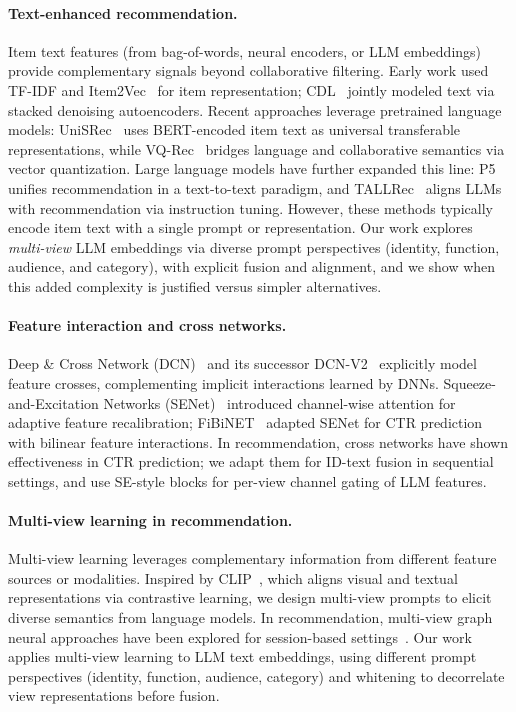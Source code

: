 \documentclass[sigconf,natbib=true,anonymous]{acmart}
\newcommand{\llm}{\textsc{LLM}\xspace}
\begin{document}
\paragraph{Text-enhanced recommendation.}
\begin{sloppypar}
Item text features (from bag-of-words, neural encoders, or
\llm embeddings) provide complementary signals beyond
collaborative filtering. Early work used TF-IDF and
Item2Vec~\cite{barkan2016item2vec} for item representation;
CDL~\cite{wang2015cdl} jointly modeled text via stacked
denoising autoencoders. Recent approaches leverage pretrained
language models: UniSRec~\cite{hou2022unisrec} uses
BERT-encoded item text as universal transferable
representations, while VQ-Rec~\cite{hou2023vqrec} bridges
language and collaborative semantics via vector quantization.
Large language models have further expanded this line:
P5~\cite{geng2022p5} unifies recommendation in a text-to-text
paradigm, and TALLRec~\cite{bao2023tallrec} aligns LLMs with
recommendation via instruction tuning.
However, these methods typically encode item text with a single
prompt or representation.
Our work explores \emph{multi-view} \llm embeddings via diverse
prompt perspectives (identity, function, audience, and category),
with explicit fusion and alignment, and we show when this added
complexity is justified versus simpler alternatives.
\end{sloppypar}

\paragraph{Feature interaction and cross networks.}
Deep \& Cross Network (DCN)~\cite{wang2017dcn} and its
successor DCN-V2~\cite{wang2021dcnv2} explicitly model feature
crosses, complementing implicit interactions learned by DNNs.
Squeeze-and-Excitation Networks (SENet)~\cite{hu2018senet}
introduced channel-wise attention for adaptive feature
recalibration; FiBiNET~\cite{huang2019fibinet} adapted SENet
for CTR prediction with bilinear feature interactions. In
recommendation, cross networks have shown effectiveness in CTR
prediction; we adapt them for ID-text fusion in sequential
settings, and use SE-style blocks for per-view channel gating of \llm
features.

\paragraph{Multi-view learning in recommendation.}
Multi-view learning leverages complementary information from
different feature sources or modalities. Inspired by
CLIP~\cite{radford2021clip}, which aligns visual and textual
representations via contrastive learning, we design multi-view
prompts to elicit diverse semantics from language models. In
recommendation, multi-view graph neural approaches have been explored for
session-based settings~\cite{huang2025mvcgnn_session}. Our work applies
multi-view learning to \llm text embeddings, using different
prompt perspectives (identity, function, audience, category)
and whitening to decorrelate view representations before
fusion.
\end{document}
